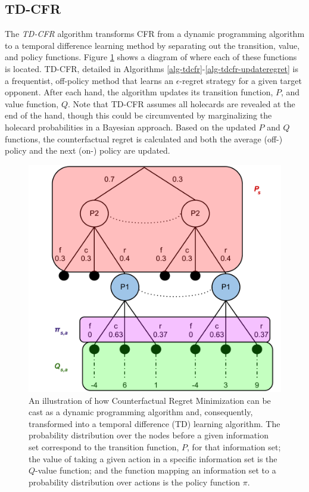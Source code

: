 \documentclass{aamas2013}
\begin{document}
    \subsection{TD-CFR}
    The \textit{TD-CFR} algorithm transforms CFR from a dynamic programming algorithm to a temporal difference learning method by separating out the transition, value, and policy functions. Figure \ref{fig-tdcfr} shows a diagram of where each of these functions is located. TD-CFR, detailed in Algorithms \ref{alg-tdcfr}-\ref{alg-tdcfr-updateregret} is a frequentist, off-policy method that learns an $\epsilon$-regret strategy for a given target opponent. After each hand, the algorithm updates its transition function, $P$, and value function, $Q$. Note that TD-CFR assumes all holecards are revealed at the end of the hand, though this could be circumvented by marginalizing the holecard probabilities in a Bayesian approach. Based on the updated $P$ and $Q$ functions, the counterfactual regret is calculated and both the average (off-) policy and the next (on-) policy are updated.

    \begin{figure}[t]
      \centering
        \includegraphics[scale=.5]{cfr_breakdown.pdf}
      \caption{An illustration of how Counterfactual Regret Minimization can be cast as a dynamic programming algorithm and, consequently, transformed into a temporal difference (TD) learning algorithm. The probability distribution over the nodes before a given information set correspond to the transition function, $P$, for that information set; the value of taking a given action in a specific information set is the $Q$-value function; and the function mapping an information set to a probability distribution over actions is the policy function $\pi$.}
      \label{fig-tdcfr}
    \end{figure}
\end{document}
